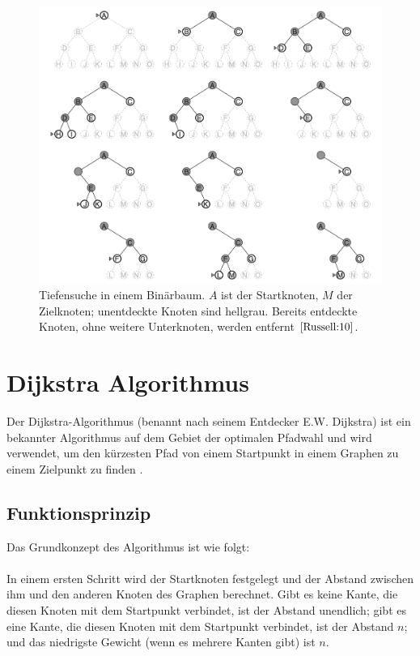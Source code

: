 \begin{figure}[H]
	\centering
	\includegraphics[width=1.0\textwidth]{images/tiefensuche.png}
	\caption{Tiefensuche in einem Binärbaum. $A$ ist der Startknoten, $M$ der Zielknoten; unentdeckte Knoten sind hellgrau. 
		Bereits entdeckte Knoten, ohne weitere Unterknoten, werden entfernt $\cite[86]{Russell:10}$.}
	\label{fig:Tiefensuche}
\end{figure}

\section{Dijkstra Algorithmus}
\label{Dijkstra Algorithmus}

Der Dijkstra-Algorithmus (benannt nach seinem Entdecker E.W. Dijkstra) ist ein bekannter Algorithmus auf dem Gebiet der optimalen
Pfadwahl und wird verwendet, um den kürzesten Pfad von einem Startpunkt in einem Graphen zu einem Zielpunkt zu finden \cite{Javaid2019}.

\subsection{Funktionsprinzip}

Das Grundkonzept des Algorithmus ist wie folgt:
\\ \\
In einem ersten Schritt wird der Startknoten festgelegt und der Abstand zwischen ihm und den anderen Knoten des Graphen berechnet. 
Gibt es keine Kante, die diesen Knoten mit dem Startpunkt verbindet, ist der Abstand unendlich; gibt es eine Kante, die 
diesen Knoten mit dem Startpunkt verbindet, ist der Abstand $n$; und das niedrigste Gewicht (wenn es mehrere Kanten gibt) ist $n$.


